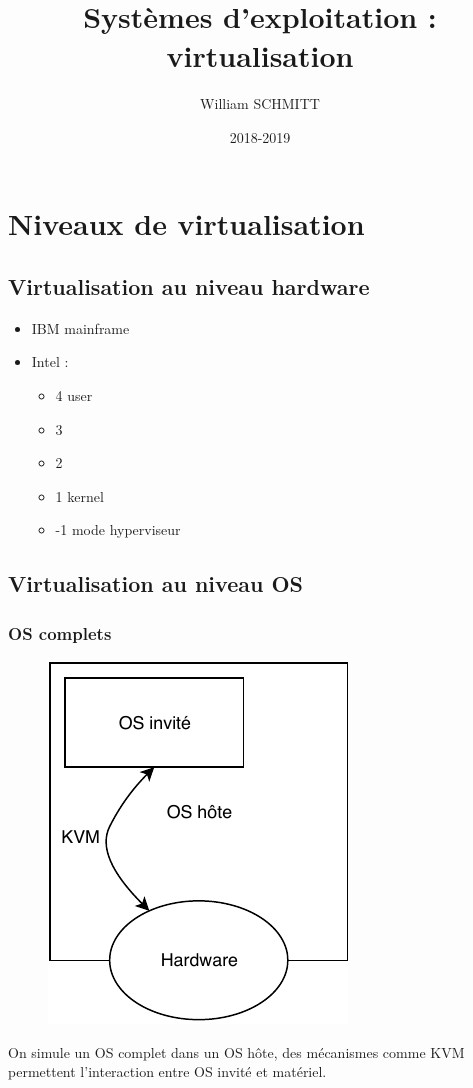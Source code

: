 \documentclass[11pt]{article}
\title{Systèmes d'exploitation : virtualisation}
\author{William SCHMITT}
\date{2018-2019}
\begin{document}
\maketitle

\section{Niveaux de virtualisation}

\subsection{Virtualisation au niveau hardware}
\begin{itemize}
    \item IBM mainframe
    \item Intel : \begin{itemize}
        \item 4 user
        \item 3
        \item 2
        \item 1 kernel
        \item -1 mode hyperviseur
    \end{itemize}
\end{itemize}

\subsection{Virtualisation au niveau OS}

\subsubsection{OS complets}
\begin{figure}[ht]
    \centering
    \includegraphics{img/c3-kvm.pdf}
\end{figure}
On simule un OS complet dans un OS hôte, des mécanismes comme KVM permettent l'interaction entre OS invité et matériel.
\end{document}
